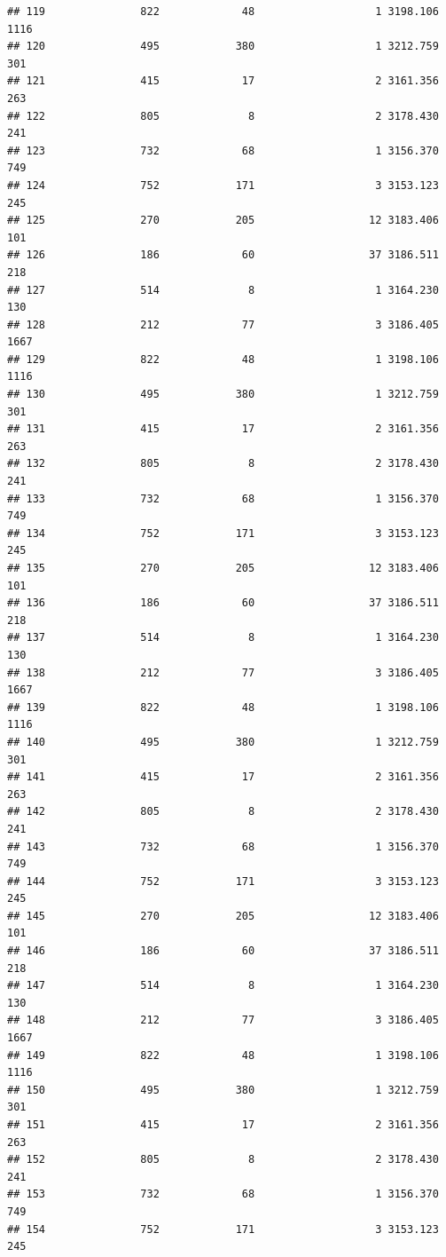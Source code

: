 \documentclass[
]{article}
\begin{document}
\begin{verbatim}
## 119               822             48                   1 3198.106 1116
## 120               495            380                   1 3212.759  301
## 121               415             17                   2 3161.356  263
## 122               805              8                   2 3178.430  241
## 123               732             68                   1 3156.370  749
## 124               752            171                   3 3153.123  245
## 125               270            205                  12 3183.406  101
## 126               186             60                  37 3186.511  218
## 127               514              8                   1 3164.230  130
## 128               212             77                   3 3186.405 1667
## 129               822             48                   1 3198.106 1116
## 130               495            380                   1 3212.759  301
## 131               415             17                   2 3161.356  263
## 132               805              8                   2 3178.430  241
## 133               732             68                   1 3156.370  749
## 134               752            171                   3 3153.123  245
## 135               270            205                  12 3183.406  101
## 136               186             60                  37 3186.511  218
## 137               514              8                   1 3164.230  130
## 138               212             77                   3 3186.405 1667
## 139               822             48                   1 3198.106 1116
## 140               495            380                   1 3212.759  301
## 141               415             17                   2 3161.356  263
## 142               805              8                   2 3178.430  241
## 143               732             68                   1 3156.370  749
## 144               752            171                   3 3153.123  245
## 145               270            205                  12 3183.406  101
## 146               186             60                  37 3186.511  218
## 147               514              8                   1 3164.230  130
## 148               212             77                   3 3186.405 1667
## 149               822             48                   1 3198.106 1116
## 150               495            380                   1 3212.759  301
## 151               415             17                   2 3161.356  263
## 152               805              8                   2 3178.430  241
## 153               732             68                   1 3156.370  749
## 154               752            171                   3 3153.123  245

\end{verbatim}
\end{document}
